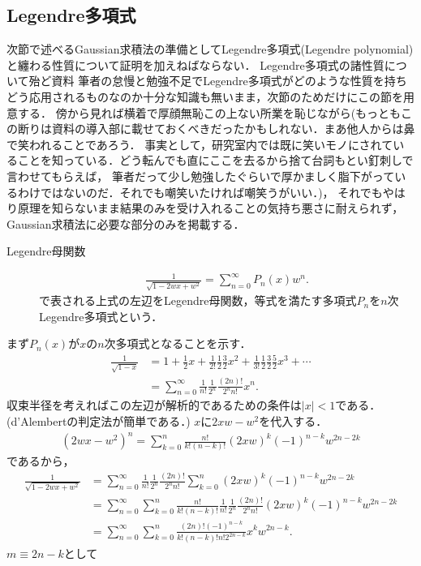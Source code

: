 \documentclass[a4j,papersize,disablejfam,slide,14pt]{jsarticle}
\begin{document}
\subsection{{\rm Legendre}多項式}
	次節で述べる{\rm Gaussian}求積法の準備として{\rm Legendre}多項式({\rm Legendre polynomial})と纏わる性質について証明を加えねばならない．
    {\rm Legendre}多項式の諸性質について殆ど資料%
    筆者の怠慢と勉強不足で{\rm Legendre}多項式がどのような性質を持ちどう応用されるものなのか十分な知識も無いまま，次節のためだけにこの節を用意する．
    傍から見れば横着で厚顔無恥この上ない所業を恥じながら(もっともこの断りは資料の導入部に載せておくべきだったかもしれない．まあ他人からは鼻で笑われることであろう．
    事実として，研究室内では既に笑いモノにされていることを知っている．どう転んでも直にここを去るから捨て台詞もとい釘刺しで言わせてもらえば，
    筆者だって少し勉強したぐらいで厚かましく脂下がっているわけではないのだ．それでも嘲笑いたければ嘲笑うがいい．)，
    それでもやはり原理を知らないまま結果のみを受け入れることの気持ち悪さに耐えられず，{\rm Gaussian}求積法に必要な部分のみを掲載する．
    \begin{screen}
    	\begin{description}
        \item[{\rm Legendre}母関数]
        	\begin{align}
            	\frac{1}{\sqrt{1 - 2wx + w^2}} = \sum_{n=0}^{\infty} P_n(x) w^n.
            \end{align}
            で表される上式の左辺を{\rm Legendre}母関数，等式を満たす多項式$P_n$を$n$次{\rm Legendre}多項式という．
    	\end{description}
    \end{screen}
    まず$P_n(x)$が$x$の$n$次多項式となることを示す．
    \begin{align}
    	\frac{1}{\sqrt{1-x}} &= 1 + \frac{1}{2}x + \frac{1}{2!}\frac{1}{2}\frac{3}{2}x^2 + \frac{1}{3!}\frac{1}{2}\frac{3}{2}\frac{5}{2}x^3 + \cdots \\
        &= \sum_{n=0}^{\infty} \frac{1}{n!}\frac{1}{2^n}\frac{(2n)!}{2^n n!} x^n.
    \end{align}
    収束半径を考えればこの左辺が解析的であるための条件は$|x|<1$である．({\rm d'Alembert}の判定法が簡単である．)
    $x$に$2xw - w^2$を代入する．
    \begin{align}
    	(2wx - w^2)^n = \sum_{k=0}^{n} \frac{n!}{k!(n-k)!} (2xw)^k (-1)^{n-k} w^{2n-2k}
    \end{align}
    であるから，
    \begin{align}
    	\frac{1}{\sqrt{1 - 2wx + w^2}} &= \sum_{n=0}^{\infty} \frac{1}{n!}\frac{1}{2^n}\frac{(2n)!}{2^n n!} \sum_{k=0}^{n} (2xw)^k (-1)^{n-k} w^{2n-2k} \\
        &= \sum_{n=0}^{\infty} \sum_{k=0}^{n} \frac{n!}{k!(n-k)!} \frac{1}{n!}\frac{1}{2^n}\frac{(2n)!}{2^n n!} (2xw)^k (-1)^{n-k} w^{2n-2k} \\
        &= \sum_{n=0}^{\infty} \sum_{k=0}^{n} \frac{(2n)! (-1)^{n-k}}{k!(n-k)!n!2^{2n-k}} x^k w^{2n-k}.
    \end{align}
    $m \equiv 2n-k$として
    
\end{document}
